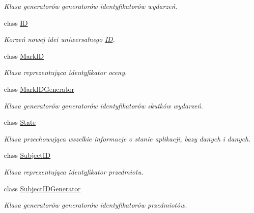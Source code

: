 \begin{DoxyCompactItemize}
\begin{DoxyCompactList}\small\item\em Klasa generatorów generatorów identyfikatorów wydarzeń. \item\end{DoxyCompactList}\item 
class \hyperlink{classobsolete_1_1ID}{ID}
\begin{DoxyCompactList}\small\item\em Korzeń nowej idei uniwersalnego \hyperlink{classobsolete_1_1ID}{ID}. \item\end{DoxyCompactList}\item 
class \hyperlink{classobsolete_1_1MarkID}{MarkID}
\begin{DoxyCompactList}\small\item\em Klasa reprezentująca identyfikator oceny. \item\end{DoxyCompactList}\item 
class \hyperlink{classobsolete_1_1MarkIDGenerator}{MarkIDGenerator}
\begin{DoxyCompactList}\small\item\em Klasa generatorów generatorów identyfikatorów skutków wydarzeń. \item\end{DoxyCompactList}\item 
class \hyperlink{classobsolete_1_1State}{State}
\begin{DoxyCompactList}\small\item\em Klasa przechowująca wszelkie informacje o stanie aplikacji, bazy danych i danych. \item\end{DoxyCompactList}\item 
class \hyperlink{classobsolete_1_1SubjectID}{SubjectID}
\begin{DoxyCompactList}\small\item\em Klasa reprezentująca identyfikator przedmiotu. \item\end{DoxyCompactList}\item 
class \hyperlink{classobsolete_1_1SubjectIDGenerator}{SubjectIDGenerator}
\begin{DoxyCompactList}\small\item\em Klasa generatorów generatorów identyfikatorów przedmiotów. \item\end{DoxyCompactList}\item 

\end{DoxyCompactItemize}
